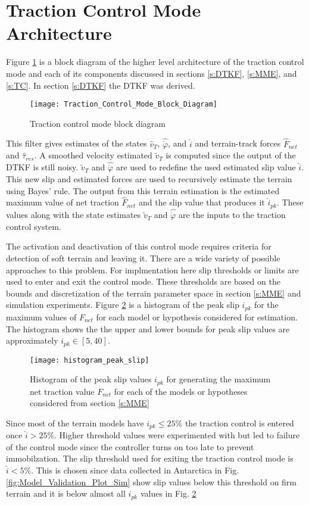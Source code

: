 \section{Traction Control Mode Architecture}
\label{s:TCMA}
Figure \ref{fig:Traction_Control_Mode_Block_Diagram} is a block diagram of the higher level architecture of the traction control mode and each of its components discussed in sections \ref{s:DTKF}, \ref{s:MME}, and \ref{s:TC}. In section \ref{s:DTKF} the DTKF was derived. 
\begin{figure}[tb]
    \centering
    \texttt{[image: Traction\_Control\_Mode\_Block\_Diagram]}
    \caption{Traction control mode block diagram}
    \label{fig:Traction_Control_Mode_Block_Diagram}
\end{figure}
This filter gives estimates of the states $\hat{v}_T$, $\hat{\dot\varphi}$, and $\hat{i}$ and terrain-track forces $\hat{F}_{net}$ and $\hat{\tau}_{res}$. A smoothed velocity estimated $\tilde{v}_T$ is computed since the output of the DTKF is still noisy. $\tilde{v}_T$ and $\hat{\dot\varphi}$ are used to redefine the used estimated slip value $\hat{i}$. This new slip and estimated forces are used to recursively estimate the terrain using Bayes' rule. The output from this terrain estimation is the estimated maximum value of net traction $\hat{F}_{net}$ and the slip value that produces it $\hat{i}_{pk}$. These values along with the state estimates $\tilde{v}_T$ and $\hat{\dot\varphi}$ are the inputs to the traction control system.

The activation and deactivation of this control mode requires criteria for detection of soft terrain and leaving it. There are a wide variety of possible approaches to this problem. For implmentation here slip thresholds or limits are used to enter and exit the control mode. These thresholds are based on the bounds and discretization of the terrain parameter space in section \ref{s:MME} and simulation experiments. Figure \ref{fig:histogram_peak_slip} is a histogram of the peak slip $i_{pk}$ for the maximum values of $F_{net}$ for each model or hypothesis considered for estimation. The histogram shows the the upper and lower bounds for peak slip values are approximately $i_{pk} \in [5,40]$.
\begin{figure}[hb]
    \centering
    \texttt{[image: histogram\_peak\_slip]}
    \caption{Histogram of the peak slip values $i_{pk}$ for generating the maximum net traction value $F_{net}$ for each of the models or hypotheses considered from section \ref{s:MME}}
    \label{fig:histogram_peak_slip}
\end{figure}
Since most of the terrain models have $i_{pk} \leq 25\%$ the traction control is entered once $\hat{i} > 25 \%$. Higher threshold values were experimented with but led to failure of the control mode since the controller turns on too late to prevent immobilzation. The slip threshold used for exiting the traction control mode is $\hat{i} < 5\%$. This is chosen since data collected in Antarctica in Fig. \ref{fig:Model_Validation_Plot_Sim} show slip values below this threshold on firm terrain and it is below almost all $i_{pk}$ values in Fig. \ref{fig:histogram_peak_slip}